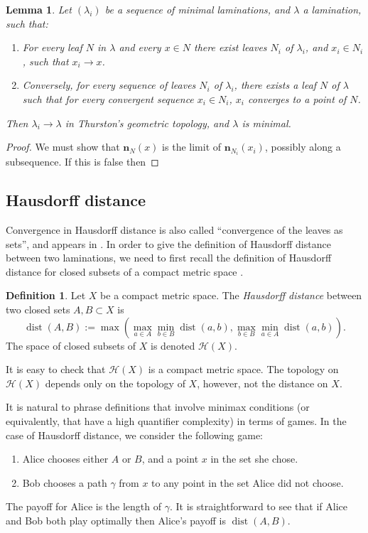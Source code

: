\documentclass[reqno,10pt]{amsart}
\DeclareMathOperator{\dist}{dist}
\newcommand{\normal}{\mathbf n}
\newcommand{\dfn}[1]{\emph{#1}\index{#1}}
\newtheorem{lemma}[theorem]{Lemma}
\theoremstyle{definition}
\newtheorem{definition}[theorem]{Definition}
\numberwithin{equation}{section}
\begin{document}
\begin{lemma}
Let $(\lambda_i)$ be a sequence of minimal laminations, and $\lambda$ a lamination, such that:
\begin{enumerate}
\item For every leaf $N$ in $\lambda$ and every $x \in N$ there exist leaves $N_i$ of $\lambda_i$, and $x_i \in N_i$, such that $x_i \to x$.
\item Conversely, for every sequence of leaves $N_i$ of $\lambda_i$, there exists a leaf $N$ of $\lambda$ such that for every convergent sequence $x_i \in N_i$, $x_i$ converges to a point of $N$.
\end{enumerate}
Then $\lambda_i \to \lambda$ in Thurston's geometric topology, and $\lambda$ is minimal.
\end{lemma}
\begin{proof}
We must show that $\normal_N(x)$ is the limit of $\normal_{N_i}(x_i)$, possibly along a subsequence.
If this is false then
\end{proof}


\subsection{Hausdorff distance}
Convergence in Hausdorff distance is also called ``convergence of the leaves as sets'', and appears in \cite{ColdingMinicozziV}.
In order to give the definition of Hausdorff distance between two laminations, we need to first recall the definition of Hausdorff distance for closed subsets of a compact metric space \cite[Chapter 2]{Pugh02}.

\begin{definition}
Let $X$ be a compact metric space. The \dfn{Hausdorff distance} between two closed sets $A, B \subset X$ is
$$\dist(A, B) := \max\left(\max_{a \in A} \min_{b \in B} \dist(a, b), \max_{b \in B} \min_{a \in A} \dist(a, b)\right).$$
The space of closed subsets of $X$ is denoted $\mathscr H(X)$.
\end{definition}

It is easy to check that $\mathscr H(X)$ is a compact metric space.
The topology on $\mathscr H(X)$ depends only on the topology of $X$, however, not the distance on $X$.

It is natural to phrase definitions that involve minimax conditions (or equivalently, that have a high quantifier complexity) in terms of games.
In the case of Hausdorff distance, we consider the following game:
\begin{enumerate}
\item Alice chooses either $A$ or $B$, and a point $x$ in the set she chose.
\item Bob chooses a path $\gamma$ from $x$ to any point in the set Alice did not choose.
\end{enumerate}
The payoff for Alice is the length of $\gamma$.
It is straightforward to see that if Alice and Bob both play optimally then Alice's payoff is $\dist(A, B)$.
\end{document}
